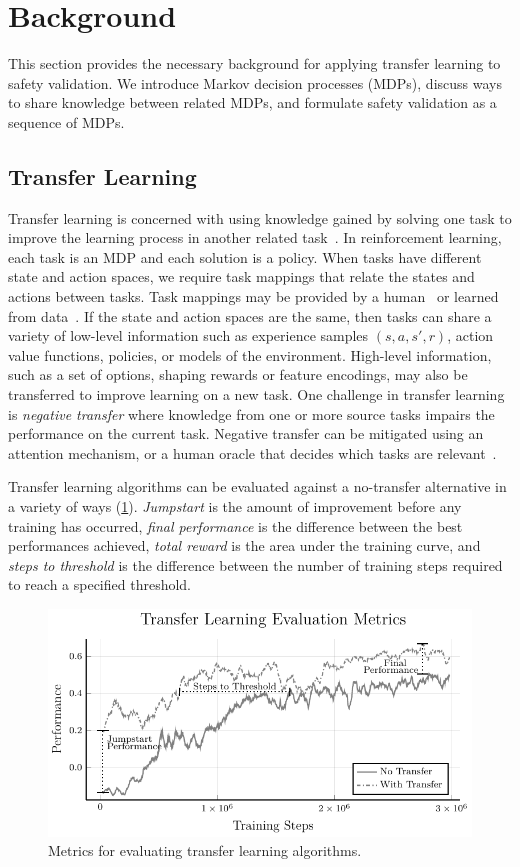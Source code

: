 \section{Background}
This section provides the necessary background for applying transfer learning to safety validation. We introduce Markov decision processes (MDPs), discuss ways to share knowledge between related MDPs, and formulate safety validation as a sequence of MDPs.

\subsection{Transfer Learning}
Transfer learning is concerned with using knowledge gained by solving one task to improve the learning process in another related task~\cite{taylor2009transfer}. In reinforcement learning, each task is an MDP and each solution is a policy. When tasks have different state and action spaces, we require task mappings that relate the states and actions between tasks. Task mappings may be provided by a human~\cite{taylor2007transfer} or learned from data~\cite{taylor2008autonomous}. If the state and action spaces are the same, then tasks can share a variety of low-level information such as experience samples $(s, a, s', r)$, action value functions, policies, or models of the environment. High-level information, such as a set of options, shaping rewards or feature encodings, may also be transferred to improve learning on a new task. One challenge in transfer learning is \emph{negative transfer} where knowledge from one or more source tasks impairs the performance on the current task. Negative transfer can be mitigated using an attention mechanism, or a human oracle that decides which tasks are relevant~\cite{taylor2009transfer}. 

Transfer learning algorithms can be evaluated against a no-transfer alternative in a variety of ways (\cref{fig:transfer_metrics}). \emph{Jumpstart} is the amount of improvement before any training has occurred, \emph{final performance} is the difference between the best performances achieved, \emph{total reward} is the area under the training curve,  and \emph{steps to threshold} is the difference between the number of training steps required to reach a specified threshold.

\begin{figure}
\centering
\includegraphics[width=0.8\linewidth]{figures/iterative_validation/transfer_metrics}
\caption{Metrics for evaluating transfer learning algorithms. }
\label{fig:transfer_metrics}
\end{figure}

